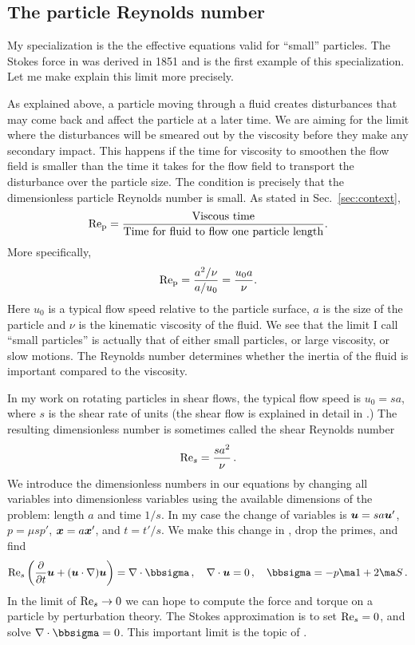 \documentclass[thesis.tex]{subfiles}
\begin{document}
\subsection{The particle Reynolds number}

My specialization is the the effective equations valid for ``small'' particles. The Stokes force in  was derived in 1851 \cite{stokes1851} and is the first example of this specialization. Let me make explain this limit more precisely.

As explained above, a particle moving through a fluid creates disturbances that may come back and affect the particle at a later time. We are aiming for the limit where the disturbances will be smeared out by the viscosity before they make any secondary impact. This happens if the time for viscosity to smoothen the flow field is smaller than the time it takes for the flow field to transport the disturbance over the particle size. The condition is precisely that the dimensionless particle Reynolds number is small. As stated in Sec.~\ref{sec:context},
\begin{align}
 	\mbox{Re}_{\mathrm p} = \frac{\textrm{Viscous time}}{\textrm{Time for fluid to flow one particle length}}.
\end{align}
More specifically,
\begin{align}
	\mbox{Re}_{\mathrm p} = \frac{a^2/\nu}{a/u_0} = \frac{u_0 a}{\nu}.
\end{align}
Here $u_0$ is a typical flow speed relative to the particle surface, $a$ is the size of the particle and $\nu$ is the kinematic viscosity of the fluid. We see that the limit I call ``small particles'' is actually that of either small particles, or large viscosity, or slow motions. The Reynolds number determines whether the inertia of the fluid is important compared to the viscosity.

In my work on rotating particles in shear flows, the typical flow speed is $u_0 = sa$, where $s$ is the shear rate of units  (the shear flow is explained in detail in .) The resulting dimensionless number is sometimes called the shear Reynolds number
\begin{align}
	\textrm{Re}_s = \frac{sa^2}{\nu}\,.
\end{align}
We introduce the dimensionless numbers in our equations by changing all variables into dimensionless variables using the available dimensions of the problem: length $a$ and time $1/s$. In my case the change of variables is $\mbox{\boldmath$u$} = sa \mbox{\boldmath$u$}'$, $p=\mu s p'$, $\mbox{\boldmath$x$}= a\mbox{\boldmath$x$}'$, and $t=t'/s$. We make this change in , drop the primes, and find
\begin{align}
\Reys \left(\pdiff{}{t}\ve u + (\ve u \cdot \nabla) \ve u\right)=\nabla \cdot \bbsigma\,,\quad \nabla \cdot \ve u = 0\,,\quad \bbsigma = -p \ma 1 + 2\ma S\,.\eqnlab{nsintrodimless}
\end{align}
In the limit of $\textrm{Re}_s\to 0$ we can hope to compute the force and torque on a particle by perturbation theory. The Stokes approximation is to set $\textrm{Re}_s=0$, and solve $\nabla \cdot \bbsigma=0$. This important limit is the topic of .
\end{document}
